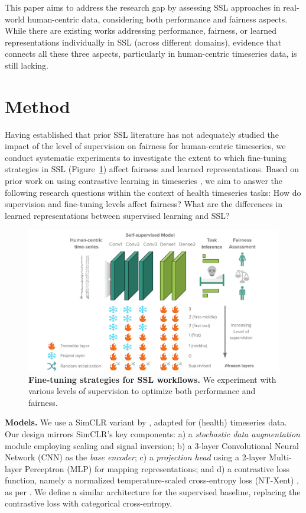 \documentclass[letterpaper]{article} %
\begin{document}
This paper aims to address the research gap by assessing SSL approaches in real-world human-centric data, considering both performance and fairness aspects.
While there are existing works addressing performance, fairness, or learned representations individually in SSL (across different domains), evidence that connects all these three aspects, particularly in human-centric timeseries data, is still lacking.

\section{Method}
\label{sec:method}
Having established that prior SSL literature has not adequately studied the impact of the level of supervision on fairness for human-centric timeseries, we conduct systematic experiments to investigate the extent to which fine-tuning strategies in SSL (Figure~\ref{fig:modelsummaries}) affect fairness and learned representations. Based on prior work on using contrastive learning in timeseries \cite{tang2020exploring}, we aim to answer the following research questions within the context of health timeseries tasks: How do supervision and fine-tuning levels affect fairness? What are the differences in learned representations between supervised learning and SSL?

\begin{figure}[htb!]
  \centering
  \includegraphics[trim={2cm 0 2.2cm 0cm},clip,width=.9\linewidth]{img/overview.pdf}
  \caption{\textbf{Fine-tuning strategies for SSL workflows.} We experiment with various levels of supervision to optimize both performance and fairness.}
  \label{fig:modelsummaries}
\end{figure}

\noindent\textbf{Models.}
We use a SimCLR \cite{chen2020simple} variant by \citet{tang2020exploring}, adapted for (health) timeseries data. Our design mirrors SimCLR's key components: a) a \textit{stochastic data augmentation} module employing scaling and signal inversion; b) a 3-layer Convolutional Neural Network (CNN) as the \textit{base encoder}; c) a \textit{projection head} using a 2-layer Multi-layer Perceptron (MLP) for mapping representations; and d) a contrastive loss function, namely a normalized temperature-scaled cross-entropy loss (NT-Xent) \cite{sohn2016improved,chen2020simple}, as per \citet{tang2020exploring}. We define a similar architecture for the supervised baseline, replacing the contrastive loss with categorical cross-entropy.
\end{document}
